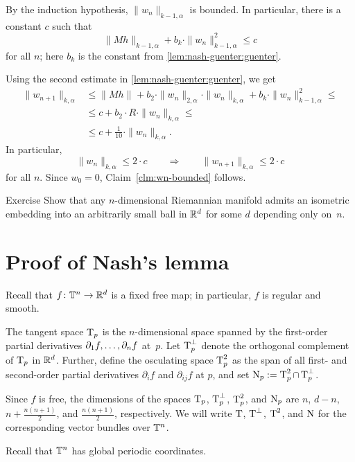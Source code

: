 By the induction hypothesis, $\|w_n\|_{k-1,\alpha}$ is bounded.
In particular, there is a constant $c$ such that
\[\|Mh\|_{k-1,\alpha}+b_k\cdot \|w_n\|_{k-1,\alpha}^2\le c\]
for all $n$; here $b_k$ is the constant from \ref{lem:nash-guenter:guenter}.

Using the second estimate in \ref{lem:nash-guenter:guenter}, we get
\begin{align*}
\|w_{n+1}\|_{k,\alpha}
&\le
\|Mh\|_{}
+
b_2\cdot \|w_n\|_{2,\alpha}\cdot \|w_n\|_{k,\alpha}
+
b_k\cdot \|w_n\|_{k-1,\alpha}^2\le
\\
&\le c+ b_2\cdot R\cdot \|w_n\|_{k,\alpha}\le
\\
&\le c +\tfrac1{10}\cdot\|w_n\|_{k,\alpha}.
\end{align*}
In particular,
\[\|w_n\|_{k,\alpha}\le 2\cdot c
\qquad\Longrightarrow\qquad
\|w_{n+1}\|_{k,\alpha}\le 2\cdot c
\]
for all $n$.
Since $w_0=0$, Claim~\ref{clm:wn-bounded} follows.
\qeds

\begin{thm}{Exercise}\label{ex:embedding-in-ball}
Show that any $n$-dimensional Riemannian manifold admits an isometric embedding into an arbitrarily small ball in $\mathbb{R}^d$ for some $d$ depending only on~$n$.
\end{thm}

\section{Proof of Nash's lemma}\label{sec:proof(nash)}

Recall that $f\colon\mathbb{T}^n \to \mathbb{R}^d$ is a fixed free map; in particular, $f$ is regular and smooth.

The tangent space $\operatorname{\rm T}_p$ is the $n$-dimensional space spanned by the first-order partial derivatives $\partial_1f,\z\dots, \partial_nf$ at~$p$.
Let $\operatorname{\rm T}_p^\perp$ denote the orthogonal complement of $\operatorname{\rm T}_p$ in $\mathbb{R}^d$.
Further, define the osculating space $\operatorname{\rm T}^2_p$ as the span of all first- and second-order partial derivatives $\partial_i f$ and $\partial_{ij} f$ at $p$, and set $\operatorname{\rm N}_p \mathrel{:=} \operatorname{\rm T}^2_p \cap \operatorname{\rm T}_p^\perp$.

Since $f$ is free, the dimensions of the spaces $\operatorname{\rm T}_p$, $\operatorname{\rm T}_p^\perp$, $\operatorname{\rm T}^2_p$, and $\operatorname{\rm N}_p$ are $n$, $d - n$, $n + \tfrac{n(n+1)}{2}$, and $\tfrac{n(n+1)}{2}$, respectively.
We will write $\operatorname{\rm T}$, $\operatorname{\rm T}^\perp$, $\operatorname{\rm T}^2$, and $\operatorname{\rm N}$ for the corresponding vector bundles over $\mathbb{T}^n$.

Recall that $\mathbb{T}^n$ has global periodic coordinates.


